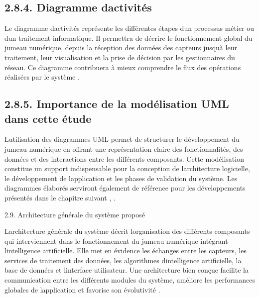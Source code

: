 \documentclass[12pt,a4paper,oneside]{report}
\begin{document}
\subsection{\texorpdfstring{\textbf{2.8.4. Diagramme
d\textquotesingle activités}}{2.8.4. Diagramme d\textquotesingle activités}}\label{diagramme-dactivituxe9s}

Le diagramme d\textquotesingle activités représente les différentes
étapes d\textquotesingle un processus métier ou d\textquotesingle un
traitement informatique. Il permettra de décrire le fonctionnement
global du jumeau numérique, depuis la réception des données des capteurs
jusqu\textquotesingle à leur traitement, leur visualisation et la prise
de décision par les gestionnaires du réseau. Ce diagramme contribuera à
mieux comprendre le flux des opérations réalisées par le système
\cite{ref124}.

\subsection{\texorpdfstring{\textbf{2.8.5. Importance de la modélisation
UML dans cette
étude}}{2.8.5. Importance de la modélisation UML dans cette étude}}\label{importance-de-la-moduxe9lisation-uml-dans-cette-uxe9tude}

L\textquotesingle utilisation des diagrammes UML permet de structurer le
développement du jumeau numérique en offrant une représentation claire
des fonctionnalités, des données et des interactions entre les
différents composants. Cette modélisation constitue un support
indispensable pour la conception de l\textquotesingle architecture
logicielle, le développement de l\textquotesingle application et les
phases de validation du système. Les diagrammes élaborés serviront
également de référence pour les développements présentés dans le
chapitre suivant \cite{ref123}, \cite{ref125}.

2.9. Architecture générale du système proposé

L\textquotesingle architecture générale du système décrit
l\textquotesingle organisation des différents composants qui
interviennent dans le fonctionnement du jumeau numérique intégrant
l\textquotesingle intelligence artificielle. Elle met en évidence les
échanges entre les capteurs, les services de traitement des données, les
algorithmes d\textquotesingle intelligence artificielle, la base de
données et l\textquotesingle interface utilisateur. Une architecture
bien conçue facilite la communication entre les différents modules du
système, améliore les performances globales de
l\textquotesingle application et favorise son évolutivité \cite{ref126}.
\end{document}
